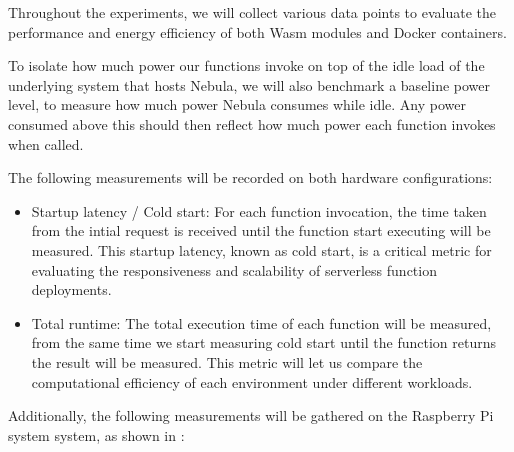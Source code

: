 \documentclass[
  table]{report}
\begin{document}
Throughout the experiments, we will collect various data points to
evaluate the performance and energy efficiency of both \ac{Wasm} modules
and Docker containers.

To isolate how much power our functions invoke on top of the idle load
of the underlying system that hosts Nebula, we will also benchmark a
baseline power level, to measure how much power Nebula consumes while
idle. Any power consumed above this should then reflect how much power
each function invokes when called.

The following measurements will be recorded on both hardware
configurations:

\begin{itemize}
\item
  Startup latency / Cold start: For each function invocation, the time
  taken from the intial request is received until the function start
  executing will be measured. This startup latency, known as cold start,
  is a critical metric for evaluating the responsiveness and scalability
  of serverless function deployments.
\item
  Total runtime: The total execution time of each function will be
  measured, from the same time we start measuring cold start until the
  function returns the result will be measured. This metric will let us
  compare the computational efficiency of each environment under
  different workloads.
\end{itemize}

Additionally, the following measurements will be gathered on the
Raspberry Pi system system, as shown in :
\end{document}
